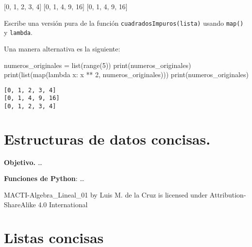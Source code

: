 \documentclass[
  letterpaper,
  DIV=11,
  numbers=noendperiod]{scrreprt}
\newenvironment{Shaded}{\begin{snugshade}}{\end{snugshade}}
\newcommand{\BuiltInTok}[1]{\textcolor[rgb]{0.00,0.23,0.31}{#1}}
\newcommand{\DecValTok}[1]{\textcolor[rgb]{0.68,0.00,0.00}{#1}}
\newcommand{\KeywordTok}[1]{\textcolor[rgb]{0.00,0.23,0.31}{#1}}
\newcommand{\NormalTok}[1]{\textcolor[rgb]{0.00,0.23,0.31}{#1}}
\newcommand{\OperatorTok}[1]{\textcolor[rgb]{0.37,0.37,0.37}{#1}}
\begin{document}
\begin{Shaded}
\begin{Highlighting}[]
\NormalTok{[}\DecValTok{0}\NormalTok{, }\DecValTok{1}\NormalTok{, }\DecValTok{2}\NormalTok{, }\DecValTok{3}\NormalTok{, }\DecValTok{4}\NormalTok{]}
\NormalTok{[}\DecValTok{0}\NormalTok{, }\DecValTok{1}\NormalTok{, }\DecValTok{4}\NormalTok{, }\DecValTok{9}\NormalTok{, }\DecValTok{16}\NormalTok{]}
\NormalTok{[}\DecValTok{0}\NormalTok{, }\DecValTok{1}\NormalTok{, }\DecValTok{4}\NormalTok{, }\DecValTok{9}\NormalTok{, }\DecValTok{16}\NormalTok{]}
\end{Highlighting}
\end{Shaded}

Escribe una versión pura de la función \texttt{cuadradosImpuros(lista)}
usando \texttt{map()} y \texttt{lambda}.

Una manera alternativa es la siguiente:

\begin{Shaded}
\begin{Highlighting}[]
\NormalTok{numeros\_originales }\OperatorTok{=} \BuiltInTok{list}\NormalTok{(}\BuiltInTok{range}\NormalTok{(}\DecValTok{5}\NormalTok{))}
\BuiltInTok{print}\NormalTok{(numeros\_originales)}
\BuiltInTok{print}\NormalTok{(}\BuiltInTok{list}\NormalTok{(}\BuiltInTok{map}\NormalTok{(}\KeywordTok{lambda}\NormalTok{ x: x }\OperatorTok{**} \DecValTok{2}\NormalTok{, numeros\_originales)))}
\BuiltInTok{print}\NormalTok{(numeros\_originales)}
\end{Highlighting}
\end{Shaded}

\begin{verbatim}
[0, 1, 2, 3, 4]
[0, 1, 4, 9, 16]
[0, 1, 2, 3, 4]
\end{verbatim}


\chapter{Estructuras de datos
concisas.}\label{estructuras-de-datos-concisas.}

\textbf{Objetivo.} \ldots{}

\textbf{Funciones de Python}: \ldots{}

MACTI-Algebra\_Lineal\_01 by Luis M. de la Cruz is licensed under
Attribution-ShareAlike 4.0 International


\chapter{Listas concisas}\label{listas-concisas}
\end{document}
